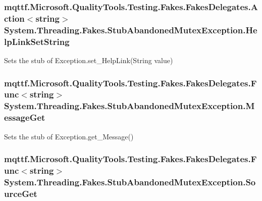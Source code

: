 \hypertarget{class_system_1_1_threading_1_1_fakes_1_1_stub_abandoned_mutex_exception_a07778cf291d2e82c96cae8d2bc4a559a}{
\subsubsection[{Help\-Link\-Set\-String}]{\setlength{\rightskip}{0pt plus 5cm}mqttf.\-Microsoft.\-Quality\-Tools.\-Testing.\-Fakes.\-Fakes\-Delegates.\-Action$<$string$>$ System.\-Threading.\-Fakes.\-Stub\-Abandoned\-Mutex\-Exception.\-Help\-Link\-Set\-String}}\label{class_system_1_1_threading_1_1_fakes_1_1_stub_abandoned_mutex_exception_a07778cf291d2e82c96cae8d2bc4a559a}


Sets the stub of Exception.\-set\-\_\-\-Help\-Link(\-String value)

\hypertarget{class_system_1_1_threading_1_1_fakes_1_1_stub_abandoned_mutex_exception_ae571c40062b696f8a6c13407212877a7}{
\subsubsection[{Message\-Get}]{\setlength{\rightskip}{0pt plus 5cm}mqttf.\-Microsoft.\-Quality\-Tools.\-Testing.\-Fakes.\-Fakes\-Delegates.\-Func$<$string$>$ System.\-Threading.\-Fakes.\-Stub\-Abandoned\-Mutex\-Exception.\-Message\-Get}}\label{class_system_1_1_threading_1_1_fakes_1_1_stub_abandoned_mutex_exception_ae571c40062b696f8a6c13407212877a7}


Sets the stub of Exception.\-get\-\_\-\-Message()

\hypertarget{class_system_1_1_threading_1_1_fakes_1_1_stub_abandoned_mutex_exception_ae27fd7b0201b39461797e5c356bdff92}{
\subsubsection[{Source\-Get}]{\setlength{\rightskip}{0pt plus 5cm}mqttf.\-Microsoft.\-Quality\-Tools.\-Testing.\-Fakes.\-Fakes\-Delegates.\-Func$<$string$>$ System.\-Threading.\-Fakes.\-Stub\-Abandoned\-Mutex\-Exception.\-Source\-Get}}\label{class_system_1_1_threading_1_1_fakes_1_1_stub_abandoned_mutex_exception_ae27fd7b0201b39461797e5c356bdff92}



